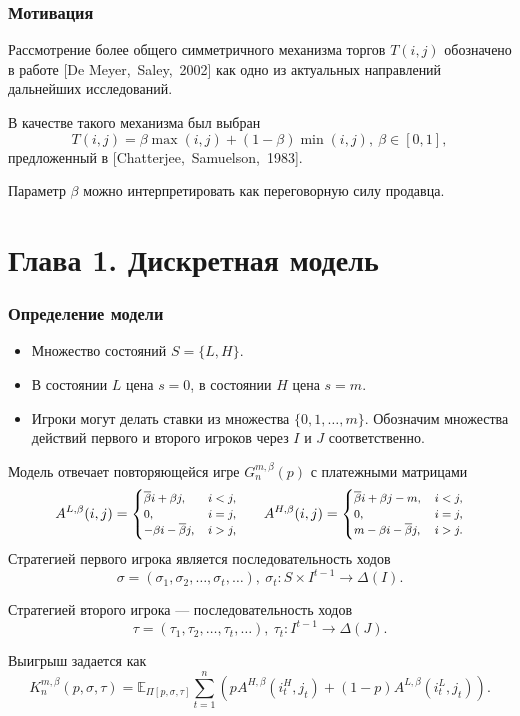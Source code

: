 \documentclass[12pt]{beamer}
\newcommand{\Co}{\beta}
\newcommand{\DCo}{\overline{\beta}}
\newcommand{\E}{\ensuremath{\mathbb{E}}}
\begin{document}
\begin{frame}
  \frametitle{Мотивация}
  
  Рассмотрение более общего симметричного механизма торгов $T(i, j)$ обозначено в работе [De Meyer,~Saley,~2002] как одно из актуальных направлений дальнейших исследований.
  
  В качестве такого механизма был выбран
  \[
    T(i, j) = \beta \max(i, j) + (1-\beta) \min(i, j),\ \beta \in [0, 1],
  \]
  предложенный в [Chatterjee,~Samuelson,~1983].
  
  Параметр $\beta$ можно интерпретировать как переговорную силу продавца.
\end{frame}

\section{Глава 1. Дискретная модель}

\begin{frame}
  \frametitle{Определение модели}
  
  \begin{itemize}
  \item 
  Множество состояний $S = \{L, H\}$.
  \item
  В состоянии $L$ цена $s=0$, в состоянии $H$ цена $s=m$.
  \item
  Игроки могут делать ставки из множества $\{0, 1, \ldots, m\}$. Обозначим множества действий первого и второго игроков через $I$ и $J$ соответственно.
  \end{itemize}
\end{frame}

\begin{frame}
  Модель отвечает повторяющейся игре $G^{m, \Co}_n(p)$ с платежными матрицами
  \begin{equation*}\footnotesize
    A^{L,\Co}(i, j) = \begin{cases}
      \DCo i + \Co j, &\, i < j, \\
      0, &\, i = j, \\
      -\Co i - \DCo j, &\, i > j,
    \end{cases}
    \qquad
    A^{H,\Co}(i, j) = \begin{cases}
      \DCo i + \Co j - m, &\, i < j, \\
      0, &\, i = j, \\
      m - \Co i - \DCo j, &\, i > j.
    \end{cases}
  \end{equation*}
  Стратегией первого игрока является последовательность ходов 
  \[
  \sigma = (\sigma_1, \sigma_2, \ldots, \sigma_t, \ldots),\ \sigma_t: S \times I^{t-1} \rightarrow \Delta(I).
  \]

  Стратегией второго игрока --- последовательность ходов 
  \[
  \tau = (\tau_1, \tau_2, \ldots, \tau_t, \ldots),\ \tau_t: I^{t-1} \rightarrow \Delta(J).
  \]

  Выигрыш задается как
  \begin{equation*}
    K^{m,\Co}_n(p, \sigma, \tau) = \E_{\Pi[p,\sigma,\tau]} \sum_{t=1}^n
    \left(
      pA^{H,\Co}(i_t^H, j_t) + (1 - p)A^{L,\Co}(i_t^L, j_t)
    \right).
  \end{equation*}
\end{frame}
\end{document}
